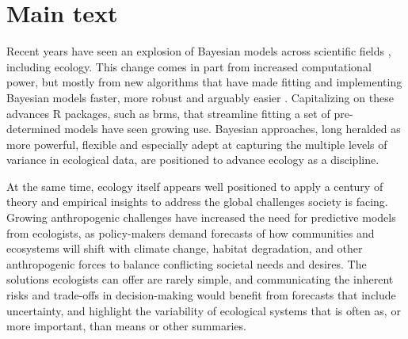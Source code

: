 \documentclass[11pt]{article}
\begin{document}
{\setlength{\parindent}{0pt}
\setlength{\parskip}{7pt}

\section*{Main text}
Recent years have seen an explosion of Bayesian models across scientific fields \citep{vandeschoot2021,schad2021,grinsztajn2021}, including ecology. This change comes in part from increased computational power, but mostly from new algorithms \citep[e.g. Hamiltonian Monte Carlo,][]{nuts2014,betan2019} that have made fitting and implementing Bayesian models faster, more robust and arguably easier \citep{Carpenter:2017stan}. Capitalizing on these advances \textsf{R} packages, such as \textsf{brms}, that streamline fitting a set of pre-determined models have seen growing use. Bayesian approaches, long heralded as more powerful, flexible and especially adept at capturing the multiple levels of variance in ecological data, are positioned to advance ecology as a discipline. %

 
At the same time, ecology itself appears well positioned to apply a century of theory and empirical insights to address the global challenges society is facing. Growing anthropogenic challenges have increased the need for predictive models from ecologists, as policy-makers demand forecasts of how communities and ecosystems will shift with climate change, habitat degradation, and other anthropogenic forces to balance conflicting societal needs and desires. The solutions ecologists can offer are rarely simple, and communicating the inherent risks and trade-offs in decision-making would benefit from forecasts that include uncertainty, and highlight the variability of ecological systems that is often as, or more important, than means or other summaries. %

}
\end{document}
